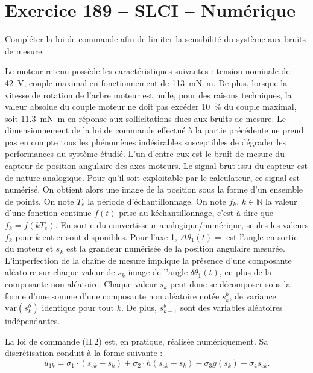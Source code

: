 \section*{Exercice 189 -- SLCI -- Numérique}
\setcounter{exo}{0}


\begin{obj}
Compléter la loi de commande afin de limiter la sensibilité du système aux bruits de mesure.
\end{obj}

Le moteur retenu possède les caractéristiques suivantes : tension nominale de \SI{42}{V}, couple maximal en fonctionnement
de \SI{113}{mN.m}. De plus, lorsque la vitesse de rotation de l’arbre moteur est nulle, pour des raisons
techniques, la valeur absolue du couple moteur ne doit pas excéder \SI{10}{\%} du couple maximal, soit \SI{11,3}{mN.m} en réponse aux sollicitations dues aux bruits de mesure.
Le dimensionnement de la loi de commande effectué à la partie précédente ne prend pas en compte tous les
phénomènes indésirables susceptibles de dégrader les performances du système étudié. L’un d’entre eux est le
bruit de mesure du capteur de position angulaire des axes moteurs. Le signal brut issu du capteur est de nature
analogique. Pour qu’il soit exploitable par le calculateur, ce signal est numérisé. On obtient alors une image de
la position sous la forme d’un ensemble de points. On note $T_e$ la période d’échantillonnage.
On note $f_k$, $k\in\mathbb{N}$ la valeur d’une fonction continue $f(t)$ prise au k\ieme échantillonnage, c’est-à-dire que
$f_k=f\left(kT_e\right)$. En sortie du convertisseur analogique/numérique, seules les valeurs $f_k$ pour $k$ entier sont disponibles.
Pour l’axe 1, $\Delta \theta_1(t)=$ est l’angle en sortie du moteur et $s_k$ est la grandeur numérisée de la position angulaire
mesurée.
L’imperfection de la chaîne de mesure implique la présence d’une composante aléatoire sur chaque valeur de $s_k$
image de l’angle $\delta \theta_1(t)$, en plus de la composante non aléatoire. Chaque valeur $s_k$ peut donc se décomposer
sous la forme d’une somme d’une composante non aléatoire notée $s_k^b$, de variance
$\text{var}\left( s_k^b\right)$ identique pour tout $k$. De plus, $s_{k-1}^b$ sont des variables aléatoires indépendantes.


La loi de commande (II.2) est, en pratique, réalisée numériquement. Sa discrétisation conduit à la forme suivante :
$$
u_{1k} = \sigma_1 \cdot\left(s_{ck}-s_k \right)+\sigma_2 \cdot h\left(s_{ck}-s_k \right)  -\sigma_3 g \left(s_k \right) + \sigma_4 s_{ck}.
$$

